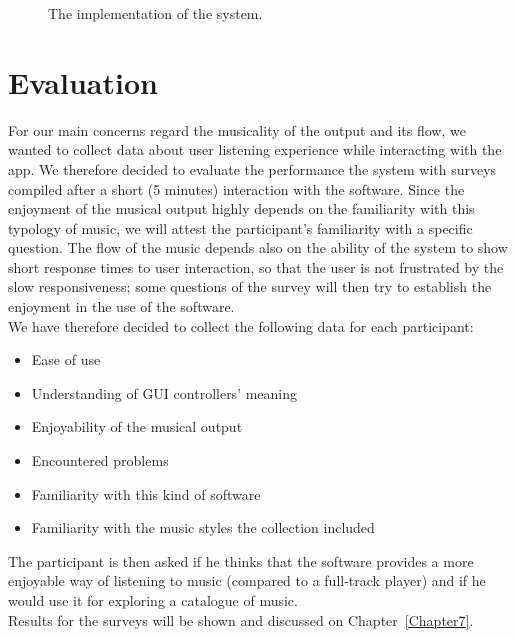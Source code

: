 \begin{figure}[bt]
\caption{The implementation of the system.}
\label{fig:extraction}
\end{figure}

\section{Evaluation}
\label{sec:evaluation_idea}
For our main concerns regard the musicality of the output and its flow, we wanted to collect data about user listening experience while interacting with the app. We therefore decided to evaluate the performance the system with surveys compiled after a short (5 minutes) interaction with the software. Since the enjoyment of the musical output highly depends on the familiarity with this typology of music, we will attest the participant's familiarity with a specific question. The flow of the music depends also on the ability of the system to show short response times to user interaction, so that the user is not frustrated by the slow responsiveness; some questions of the survey will then try to establish the enjoyment in the use of the software.\\
We have therefore decided to collect the following data for each participant:
\begin{itemize}
\item Ease of use
\item Understanding of GUI controllers' meaning
\item Enjoyability of the musical output
\item Encountered problems
\item Familiarity with this kind of software
\item Familiarity with the music styles the collection included 
\end{itemize}

The participant is then asked if he thinks that the software provides a more enjoyable way of listening to music (compared to a full-track player) and if he would use it for exploring a catalogue of music. \\
Results for the surveys will be shown and discussed on Chapter~\ref{Chapter7}.